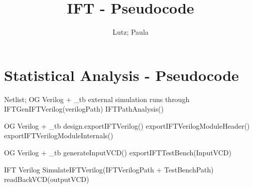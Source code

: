 \documentclass{article}
\title{IFT - Pseudocode}
\author{Lutz; Paula}
\begin{document}
    
\maketitle

\section*{Statistical Analysis - Pseudocode}

\begin{algorithm}
    \caption{StatAnalysis (Statistical Analysis using IFT-functions in SA class)}
    \begin{algorithmic}[1]
        \Require Netlist; OG Verilog + \_tb
        \Ensure external simulation runs through
        \State IFTGenIFTVerilog(verilogPath) 
        \State IFTPathAnalysis()
    \end{algorithmic}
\end{algorithm}

\begin{algorithm}
    \caption{IFTGenVerilog (IFTGeneration of extended Verilog)}
    \begin{algorithmic}[1]
        \Require OG Verilog + \_tb
        \State design.exportIFTVerilog()
                \State exportIFTVerilogModuleHeader()
                \State exportIFTVerilogModuleInternals()
            \EndFor
    \end{algorithmic}
\end{algorithm}

\begin{algorithm}
    \caption{IFTGenTestBench (IFTGeneration of IFT testbench)}
    \begin{algorithmic}[1]
        \Require OG Verilog + \_tb
        \State generateInputVCD() 
        \State exportIFTTestBench(InputVCD)
    \end{algorithmic}
\end{algorithm}

\begin{algorithm}
    \caption{IFTExe (IFTExecution)}
    \begin{algorithmic}[1]
        \Require IFT Verilog
        \State SimulateIFTVerilog(IFTVerilogPath + TestBenchPath)
        \State readBackVCD(outputVCD) 
    \end{algorithmic}
\end{algorithm}
\end{document}
